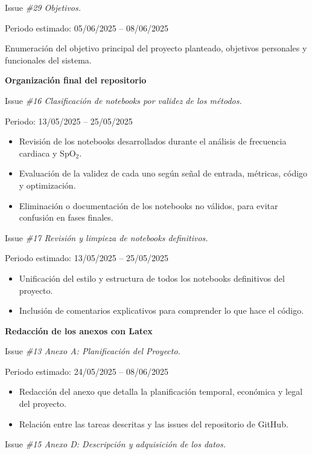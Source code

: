 \vspace{0.3cm}

Issue \textit{\#29 Objetivos.}

Periodo estimado: 05/06/2025 – 08/06/2025

Enumeración del objetivo principal del proyecto planteado, objetivos personales y funcionales del sistema.

\newpage

\textbf{Organización final del repositorio}

Issue \textit{\#16 Clasificación de notebooks por validez de los métodos.}

Periodo: 13/05/2025 – 25/05/2025

\begin{itemize}
    \item Revisión de los notebooks desarrollados durante el análisis de frecuencia cardiaca y SpO$_2$.
    \item Evaluación de la validez de cada uno según señal de entrada, métricas, código y optimización.
    \item Eliminación o documentación de los notebooks no válidos, para evitar confusión en fases finales.
\end{itemize}

Issue \textit{\#17 Revisión y limpieza de notebooks definitivos.}

Periodo estimado: 13/05/2025 – 25/05/2025

\begin{itemize}
    \item Unificación del estilo y estructura de todos los notebooks definitivos del proyecto.
    \item Inclusión de comentarios explicativos para comprender lo que hace el código.
\end{itemize}

\textbf{Redacción de los anexos con Latex}

Issue \textit{\#13 Anexo A: Planificación del Proyecto.}

Periodo estimado: 24/05/2025 – 08/06/2025

\begin{itemize}
    \item Redacción del anexo que detalla la planificación temporal, económica y legal del proyecto.
    \item Relación entre las tareas descritas y las issues del repositorio de GitHub.
\end{itemize}

Issue \textit{\#15 Anexo D: Descripción y adquisición de los datos.}


